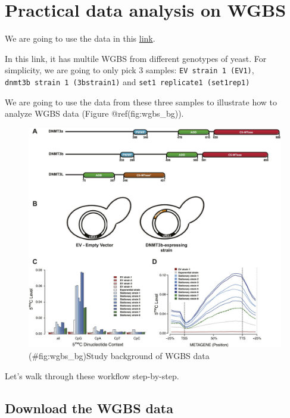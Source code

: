 \documentclass[]{book}
\begin{document}
\hypertarget{practical-data-analysis-on-wgbs}{%
\chapter{Practical data analysis on WGBS}\label{practical-data-analysis-on-wgbs}}

We are going to use the data in this \href{https://www.ncbi.nlm.nih.gov//geo/query/acc.cgi?acc=GSE66905}{link}.

In this link, it has multile WGBS from different genotypes of yeast. For simplicity, we are going to only pick 3 samples: \texttt{EV\ strain\ 1\ (EV1)}, \texttt{dnmt3b\ strain\ 1\ (3bstrain1)} and \texttt{set1\ replicate1\ (set1rep1)}

We are going to use the data from these three samples to illustrate how to analyze WGBS data (Figure @ref(fig:wgbs\_bg)).

\begin{figure}
\centering
\includegraphics{figures/elife_yeast_paper.jpg}
\caption{(\#fig:wgbs\_bg)Study background of WGBS data}
\end{figure}

Let's walk through these workflow step-by-step.

\hypertarget{download-the-wgbs-data}{%
\section{Download the WGBS data}\label{download-the-wgbs-data}}
\end{document}
